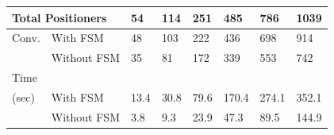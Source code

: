 \documentclass[]{spie}  %
\begin{document}
\begin{figure}[H]
\begin{minipage}{9cm}
{				\tiny
				\begin{tabular}{|l|l|l|l|l|l|l|l|}
					\hline
					\multicolumn{2}{|l|}{Total Positioners}  & 54 & 114 & 251 & 485 & 786 & 1039\\
					\hline
					Conv. & With FSM  & 48 & 103  & 222 & 436 & 698 & 914 \\
					\cline{2-8}
					& Without FSM & 35  & 81 & 172 & 339 & 553 & 742 \\
					\hline
					Time\\(sec) & With FSM  & 13.4 & 30.8 & 79.6 & 170.4 & 274.1 & 352.1 \\
					\cline{2-8}
					& Without FSM  & 3.8  & 9.3 & 23.9 & 47.3 & 89.5  & 144.9 \\
					\hline
				\end{tabular}
				}
				\label{configuration4_result} 
			\end{minipage}
		\end{figure}
\end{document}

